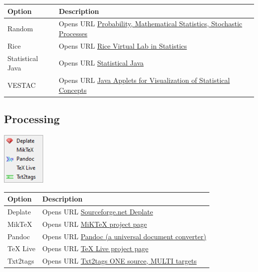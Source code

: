 \begin{scriptsize}
\begin{tabularx}{\textwidth}{>{\hsize=0.3\hsize}X>{\hsize=0.7\hsize}X}\\
    \hline
    \textbf{Option} & \textbf{Description} \\
    \hline
    Random & Opens URL \href{https://www.randomservices.org/random/}
     {Probability, Mathematical Statistics, Stochastic Processes} \\
    Rice & Opens URL \href{http://onlinestatbook.com/rvls.html}{Rice Virtual Lab in Statistics} \\
    Statistical Java & Opens URL \href{http://www.causeweb.org/repository/statjava/}{Statistical Java} \\
    VESTAC & Opens URL \href{http://lstat.kuleuven.be/newjava/vestac/}
     {Java Applets for Visualization of Statistical Concepts} \\
    \hline
  \end{tabularx}
\end{scriptsize}


\newpage
\hypertarget{menu_web_processing}{}
\subsection{Processing}

\includegraphics[scale=0.50]{./res/menu_web_processing.png}\\

\begin{scriptsize}
  \begin{tabularx}{\textwidth}{>{\hsize=0.3\hsize}X>{\hsize=0.7\hsize}X}\\
    \hline
    \textbf{Option} & \textbf{Description} \\
    \hline
    Deplate & Opens URL \href{http://deplate.sourceforge.net/index.php}{Sourceforge.net Deplate} \\
    MikTeX & Opens URL \href{http://miktex.org/}{MiKTeX project page} \\
    Pandoc & Opens URL \href{http://johnmacfarlane.net/pandoc/}{Pandoc (a universal document converter)} \\
    TeX Live & Opens URL \href{https://tug.org/texlive/}{TeX Live project page} \\
    Txt2tags & Opens URL \href{http://txt2tags.sourceforge.net/}{Txt2tags ONE source, MULTI targets} \\
    \hline
  \end{tabularx}
\end{scriptsize}
